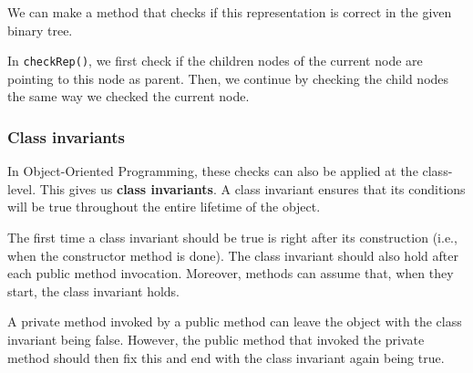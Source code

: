 We can make a method that checks if this representation is correct in
the given binary tree.

\begin{Shaded}
\begin{Highlighting}[]
  
\NormalTok{();}
\NormalTok{();}

      \NormalTok{;}

  \NormalTok{) \{}
\NormalTok{  \}}
  \NormalTok{) \{}
\NormalTok{  \}}
\NormalTok{\}}
\end{Highlighting}
\end{Shaded}

In \texttt{checkRep()}, we first check if the children nodes of the
current node are pointing to this node as parent. Then, we continue by
checking the child nodes the same way we checked the current node.

\hypertarget{class-invariants}{%
\subsubsection{Class invariants}\label{class-invariants}}

In Object-Oriented Programming, these checks can also be applied at the
class-level. This gives us \textbf{class invariants}. A class invariant
ensures that its conditions will be true throughout the entire lifetime
of the object.

The first time a class invariant should be true is right after its
construction (i.e., when the constructor method is done). The class
invariant should also hold after each public method invocation.
Moreover, methods can assume that, when they start, the class invariant
holds.

A private method invoked by a public method can leave the object with
the class invariant being false. However, the public method that invoked
the private method should then fix this and end with the class invariant
again being true.

